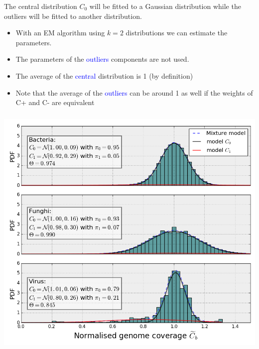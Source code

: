 \documentclass{beamer}
\begin{document}
\begin{frame}
 
The central distribution $C_0$ will be fitted to a Gaussian 
distribution while the outliers will be fitted to another 
distribution.

\begin{itemize}
\item With an EM algorithm using $k=2$ distributions we can estimate the parameters. 
\item The parameters of the \textcolor{blue}{outliers} components are not used. 
\item The average of the \textcolor{blue}{central} distribution is  1 (by definition)
\item Note that the average of the \textcolor{blue}{outliers} can be around 1 as
well if the weights of C+ and C- are equivalent
\end{itemize}
\end{frame}


\begin{frame}
\frametitle{}
\begin{center}
\includegraphics[height=0.9\textheight, 
    width=1\textwidth]{images/figure_em.png}
\end{center} 
\end{frame}
\end{document}
